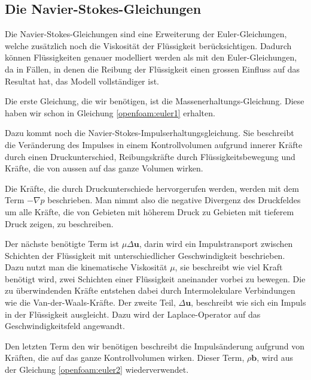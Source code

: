 \subsection{Die Navier-Stokes-Gleichungen}\label{openfoam:navierstokes}
Die Navier-Stokes-Gleichungen sind eine Erweiterung der Euler-Gleichungen, welche zusätzlich noch die Viskosität der Flüssigkeit berücksichtigen.
%
Dadurch können Flüssigkeiten genauer modelliert werden als mit den Euler-Gleichungen, da in Fällen, in denen die Reibung der Flüssigkeit einen grossen Einfluss auf das Resultat hat, das Modell vollständiger ist.
%
%

Die erste Gleichung, die wir benötigen, ist die Massenerhaltungs-Gleichung.
Diese haben wir schon in Gleichung \eqref{openfoam:euler1} erhalten.

Dazu kommt noch die Navier-Stokes-Impulserhaltungsgleichung.
Sie beschreibt die Veränderung des Impulses in einem Kontrollvolumen aufgrund innerer Kräfte durch einen Druckunterschied, Reibungskräfte durch Flüssigkeitsbewegung und Kräfte, die von aussen auf das ganze Volumen wirken.

Die Kräfte, die durch Druckunterschiede hervorgerufen werden, werden mit dem Term $- \nabla p$ beschrieben.
Man nimmt also die negative Divergenz des Druckfeldes um alle Kräfte, die von Gebieten mit höherem Druck zu Gebieten mit tieferem Druck zeigen, zu beschreiben.

Der nächste benötigte Term ist $\mu \Delta \mathbf{u}$, darin wird ein Impulstransport zwischen Schichten der Flüssigkeit mit unterschiedlicher Geschwindigkeit beschrieben.
Dazu nutzt man die kinematische Viskosität $\mu$, sie beschreibt wie viel Kraft benötigt wird, zwei Schichten einer Flüssigkeit aneinander vorbei zu bewegen.
%
%
Die zu überwindenden Kräfte entstehen dabei durch Intermolekulare Verbindungen wie die Van-der-Waals-Kräfte.
%
Der zweite Teil, $\Delta \mathbf{u}$, beschreibt wie sich ein Impuls in der Flüssigkeit ausgleicht.
Dazu wird der Laplace-Operator auf das Geschwindigkeitsfeld angewandt.

Den letzten Term den wir benötigen beschreibt die Impulsänderung aufgrund von Kräften, die auf das ganze Kontrollvolumen wirken.
Dieser Term, $\rho \mathbf{b}$, wird aus der Gleichung \eqref{openfoam:euler2} wiederverwendet.

